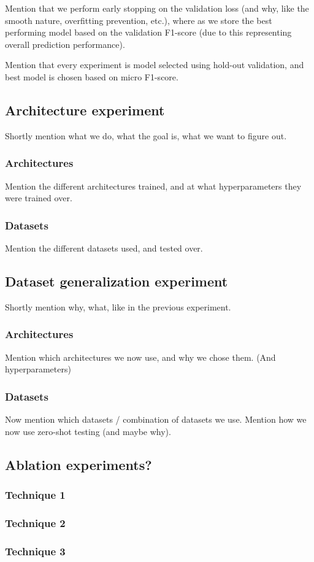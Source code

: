 Mention that we perform early stopping on the validation loss (and why, like the smooth nature, overfitting prevention, etc.), where as we store the best performing model based on the validation F1-score (due to this representing overall prediction performance).

Mention that every experiment is model selected using hold-out validation, and best model is chosen based on micro F1-score.

\subsection{Architecture experiment}

Shortly mention what we do, what the goal is, what we want to figure out.

\subsubsection{Architectures}
Mention the different architectures trained, and at what hyperparameters they were trained over.

\subsubsection{Datasets}
Mention the different datasets used, and tested over.


\subsection{Dataset generalization experiment}

Shortly mention why, what, like in the previous experiment.

\subsubsection{Architectures}

Mention which architectures we now use, and why we chose them. (And hyperparameters)

\subsubsection{Datasets}

Now mention which datasets / combination of datasets we use. Mention how we now use zero-shot testing (and maybe why).


\subsection{Ablation experiments?}

\subsubsection{Technique 1}

\subsubsection{Technique 2}

\subsubsection{Technique 3}